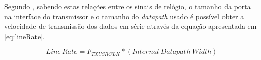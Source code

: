 
\begin{table}[h!]
	\centering
	\caption[Relação entre as frequências dos sinais de relógio \textit{TXUSRCLK2} e \textit{TXUSRCLK}]{Relação entre as frequências dos sinais de relógio \textit{TXUSRCLK2} e \textit{TXUSRCLK} (adaptada de \cite{R011})}
	\label{table:freq_tx}
\end{table}


Segundo \cite{R011}, sabendo estas relações entre os sinais de relógio, o tamanho da porta na interface do transmissor e o tamanho do \textit{datapath} usado é possível obter a velocidade de transmissão dos dados em série através da equação apresentada em \ref{eq:lineRate}.

\begin{equation} \label{eq:lineRate}
Line\ Rate = F_{TXUSRCLK}*(Internal\ Datapath\ Width)
\end{equation}


